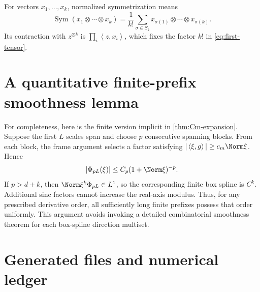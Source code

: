 \documentclass[11pt,oneside]{article}
\theoremstyle{definition}
\theoremstyle{remark}
\newcommand{\Sym}{\operatorname{Sym}}
\newcommand{\ip}[2]{\left\langle #1,#2\right\rangle}
\begin{document}
For vectors $x_1,\ldots,x_k$, normalized symmetrization means
\[
 \Sym(x_1\otimes\cdots\otimes x_k)
 =\frac1{k!}\sum_{\sigma\in S_k}
 x_{\sigma(1)}\otimes\cdots\otimes x_{\sigma(k)}.
\]
Its contraction with $z^{\otimes k}$ is
$\prod_i\ip{z}{x_i}$, which fixes the factor $k!$ in
\eqref{eq:first-tensor}.

\section{A quantitative finite-prefix smoothness lemma}
\label{app:finite-smoothness}

For completeness, here is the finite version implicit in
\cref{thm:Cm-expansion}.  Suppose the first $L$ scales span and choose $p$
consecutive spanning blocks.  From each block, the frame argument selects a
factor satisfying $|\ip{\xi}{g}|\ge c_m\Norm\xi$.  Hence
\[
 |\Phi_{pL}(\xi)|\le C_p(1+\Norm\xi)^{-p}.
\]
If $p>d+k$, then $\Norm\xi^k\Phi_{pL}\in L^1$, so the corresponding finite box
spline is $C^k$.  Additional sinc factors cannot increase the real-axis modulus.
Thus, for any prescribed derivative order, all sufficiently long finite
prefixes possess that order uniformly.  This argument avoids invoking a detailed
combinatorial smoothness theorem for each box-spline direction multiset.

\section{Generated files and numerical ledger}
\label{app:files}
\end{document}
